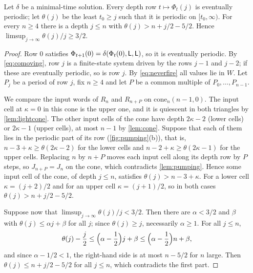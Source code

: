 \begin{theorem}\label{thm:third}
Let $\delta$ be a minimal-time solution. Every depth row $t\mapsto\Phi_t(j)$ is
eventually periodic; let $\theta(j)$ be the least $t_0\ge j$ such that it is
periodic on $[t_0,\infty)$. For every $n\ge4$ there is a depth $j\le n$ with
$\theta(j)>n+j/2-5/2$. Hence
$\limsup_{j\to\infty}\theta(j)/j\ge 3/2$.
\end{theorem}

\begin{proof}
Row $0$ satisfies $\Phi_{t+1}(0)=\delta(\Phi_t(0),\mathsf L,\mathsf L)$, so it is
eventually periodic. By \eqref{eq:comoving}, row $j$ is a finite-state system
driven by the rows $j-1$ and $j-2$; if these are eventually periodic, so is row
$j$. By \eqref{eq:neverfire} all values lie in $W$. Let $P_j$ be a period of
row $j$, fix $n\ge4$ and let $P$ be a common multiple of $P_0,\dots,P_{n-1}$.

We compare the input words of $R_n$ and $R_{n+P}$ on $\mathrm{cone}_n(n-1,0)$.
The input cell at $\kappa=0$ in this cone is the upper one, and it is quiescent
in both triangles by \cref{lem:lightcone}. The other input cells of the cone
have depth $2\kappa-2$ (lower cells) or $2\kappa-1$ (upper cells), at most
$n-1$ by \cref{lem:cone}. Suppose that each of them lies in the periodic part of
its row (\cref{fig:pumping}(b)), that is, $n-3+\kappa\ge\theta(2\kappa-2)$ for the lower cells and
$n-2+\kappa\ge\theta(2\kappa-1)$ for the upper cells. Replacing $n$ by $n+P$
moves each input cell along its depth row by $P$ steps, so $J_{n+P}=J_n$ on the
cone, which contradicts \cref{lem:pumping}. Hence some input cell of the cone,
of depth $j\le n$, satisfies $\theta(j)>n-3+\kappa$. For a lower cell
$\kappa=(j+2)/2$ and for an upper cell $\kappa=(j+1)/2$, so in both cases
$\theta(j)>n+j/2-5/2$.

Suppose now that $\limsup_{j\to\infty}\theta(j)/j<3/2$. Then there are
$\alpha<3/2$ and $\beta$ with $\theta(j)\le\alpha j+\beta$ for all $j$;
since $\theta(j)\ge j$, necessarily $\alpha\ge1$. For all $j\le n$,
\[
\theta(j)-\frac{j}{2}\le\Bigl(\alpha-\frac12\Bigr)j+\beta\le\Bigl(\alpha-\frac12\Bigr)n+\beta,
\]
and since $\alpha-1/2<1$, the right-hand side is at most $n-5/2$ for $n$ large.
Then $\theta(j)\le n+j/2-5/2$ for all $j\le n$, which contradicts the first
part.
\end{proof}


